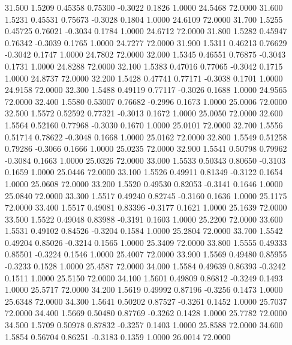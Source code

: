   31.500   1.5209   0.45358   0.75300  -0.3022   0.1826   1.0000  24.5468  72.0000
  31.600   1.5231   0.45531   0.75673  -0.3028   0.1804   1.0000  24.6109  72.0000
  31.700   1.5255   0.45725   0.76021  -0.3034   0.1784   1.0000  24.6712  72.0000
  31.800   1.5282   0.45947   0.76342  -0.3039   0.1765   1.0000  24.7277  72.0000
  31.900   1.5311   0.46213   0.76629  -0.3042   0.1747   1.0000  24.7802  72.0000
  32.000   1.5345   0.46551   0.76875  -0.3043   0.1731   1.0000  24.8288  72.0000
  32.100   1.5383   0.47016   0.77065  -0.3042   0.1715   1.0000  24.8737  72.0000
  32.200   1.5428   0.47741   0.77171  -0.3038   0.1701   1.0000  24.9158  72.0000
  32.300   1.5488   0.49119   0.77117  -0.3026   0.1688   1.0000  24.9565  72.0000
  32.400   1.5580   0.53007   0.76682  -0.2996   0.1673   1.0000  25.0006  72.0000
  32.500   1.5572   0.52592   0.77321  -0.3013   0.1672   1.0000  25.0050  72.0000
  32.600   1.5564   0.52160   0.77968  -0.3030   0.1670   1.0000  25.0101  72.0000
  32.700   1.5556   0.51714   0.78622  -0.3048   0.1668   1.0000  25.0162  72.0000
  32.800   1.5549   0.51258   0.79286  -0.3066   0.1666   1.0000  25.0235  72.0000
  32.900   1.5541   0.50798   0.79962  -0.3084   0.1663   1.0000  25.0326  72.0000
  33.000   1.5533   0.50343   0.80650  -0.3103   0.1659   1.0000  25.0446  72.0000
  33.100   1.5526   0.49911   0.81349  -0.3122   0.1654   1.0000  25.0608  72.0000
  33.200   1.5520   0.49530   0.82053  -0.3141   0.1646   1.0000  25.0840  72.0000
  33.300   1.5517   0.49240   0.82745  -0.3160   0.1636   1.0000  25.1175  72.0000
  33.400   1.5517   0.49081   0.83396  -0.3177   0.1621   1.0000  25.1639  72.0000
  33.500   1.5522   0.49048   0.83988  -0.3191   0.1603   1.0000  25.2200  72.0000
  33.600   1.5531   0.49102   0.84526  -0.3204   0.1584   1.0000  25.2804  72.0000
  33.700   1.5542   0.49204   0.85026  -0.3214   0.1565   1.0000  25.3409  72.0000
  33.800   1.5555   0.49333   0.85501  -0.3224   0.1546   1.0000  25.4007  72.0000
  33.900   1.5569   0.49480   0.85955  -0.3233   0.1528   1.0000  25.4587  72.0000
  34.000   1.5584   0.49639   0.86393  -0.3242   0.1511   1.0000  25.5150  72.0000
  34.100   1.5601   0.49809   0.86812  -0.3249   0.1493   1.0000  25.5717  72.0000
  34.200   1.5619   0.49992   0.87196  -0.3256   0.1473   1.0000  25.6348  72.0000
  34.300   1.5641   0.50202   0.87527  -0.3261   0.1452   1.0000  25.7037  72.0000
  34.400   1.5669   0.50480   0.87769  -0.3262   0.1428   1.0000  25.7782  72.0000
  34.500   1.5709   0.50978   0.87832  -0.3257   0.1403   1.0000  25.8588  72.0000
  34.600   1.5854   0.56704   0.86251  -0.3183   0.1359   1.0000  26.0014  72.0000
